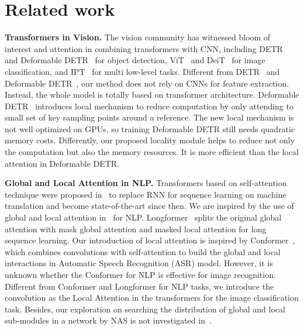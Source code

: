 \documentclass[10pt,twocolumn,letterpaper]{article}
\begin{document}
\section{Related work}

\noindent\textbf{Transformers in Vision.} The vision community has witnessed bloom of interest and attention in combining transformers with CNN,  including DETR~\cite{DETR} and Deformable DETR~\cite{Defor-Detr} for object detection, ViT~\cite{vit_trans} and DeiT~\cite{deit} for image classification, and IPT~\cite{ipt-chen2020pre} for multi low-level tasks. 
Different from DETR~\cite{DETR} and Deformable DETR~\cite{Defor-Detr}, our method does not rely on CNNs for feature extraction. Instead, the whole model is totally based on transformer architecture. Deformable DETR~\cite{Defor-Detr} introduces local mechanism to reduce computation by only attending to small set of key sampling points around a reference. The new local mechanism is not well optimized on GPUs, so training Deformable DETR still needs quadratic memory costs. Differently, our proposed locality module helps to reduce not only the computation but also the memory resources. It is more efficient than the local attention in Deformable DETR.

\noindent\textbf{Global and Local Attention in NLP.} Transformers based on self-attention technique were proposed in~\cite{trans} to replace RNN for sequence learning on machine translation and become state-of-the-art since then. 
We are inspired by the use of global and local attention in~\cite{conformer, longformer-20} for NLP.
Longformer~\cite{longformer-20} splits the original global attention with mask global attention and masked local attention for long sequence learning.
Our introduction of local attention is inspired by Conformer~\cite{conformer}, which combines convolutions with self-attention to build the global and local interactions in Automatic Speech Recognition (ASR) model. However, it is unknown whether the Conformer for NLP is effective for image recognition.
Different from Conformer and Longformer for NLP tasks, we introduce the convolution as the Local Attention in the transformers for the image classification task. Besides, our exploration on searching the distribution of global and local sub-modules in a network by NAS is not investigated in~\cite{longformer-20, conformer}. 
\end{document}
